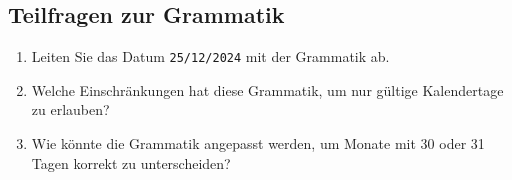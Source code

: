 \documentclass[a4paper,12pt]{article}
\begin{document}
	\subsection*{Teilfragen zur Grammatik}
	\begin{enumerate}
		\item Leiten Sie das Datum \texttt{25/12/2024} mit der Grammatik ab.
		\item Welche Einschränkungen hat diese Grammatik, um nur gültige Kalendertage zu erlauben?
		\item Wie könnte die Grammatik angepasst werden, um Monate mit 30 oder 31 Tagen korrekt zu unterscheiden?
	\end{enumerate}
	
	
\end{document}
